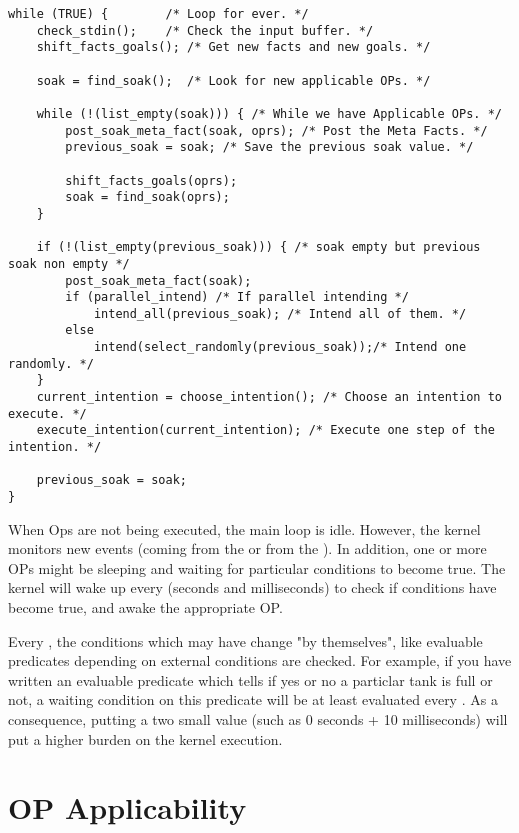 \begin{verbatim}
while (TRUE) {        /* Loop for ever. */
    check_stdin();    /* Check the input buffer. */
    shift_facts_goals(); /* Get new facts and new goals. */

    soak = find_soak();  /* Look for new applicable OPs. */

    while (!(list_empty(soak))) { /* While we have Applicable OPs. */
        post_soak_meta_fact(soak, oprs); /* Post the Meta Facts. */
        previous_soak = soak; /* Save the previous soak value. */

        shift_facts_goals(oprs);
        soak = find_soak(oprs);
    }

    if (!(list_empty(previous_soak))) { /* soak empty but previous soak non empty */
        post_soak_meta_fact(soak);
        if (parallel_intend) /* If parallel intending */
            intend_all(previous_soak); /* Intend all of them. */
        else
            intend(select_randomly(previous_soak));/* Intend one randomly. */
    }
    current_intention = choose_intention(); /* Choose an intention to execute. */
    execute_intention(current_intention); /* Execute one step of the intention. */

    previous_soak = soak;
}
\end{verbatim}

When Ops are not being executed, the main loop is idle. However, the
kernel monitors new events (coming from the \MP{} or from the
\OPRSS{}). In addition, one or more OPs might be sleeping and waiting for particular 
conditions to become true. The \OPRSS{} kernel will wake up
every  (seconds and
milliseconds) to check if conditions have become true, and awake the appropriate OP.

Every , the conditions which may have change "by themselves",
like evaluable predicates depending on external conditions are checked. For
example, if you have written an evaluable predicate which tells if yes or no a
particlar tank is full or not, a waiting condition on this predicate will be at
least evaluated every . As a
consequence, putting a two small value (such as 0 seconds + 10 milliseconds)
will put a higher burden on the kernel execution.

\section{OP Applicability}

